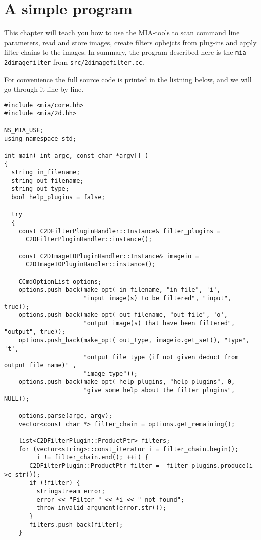\documentclass[english, 10pt, a4paper,headsepline,openany]{scrbook}
\begin{document}
\section{A simple program}
\label{ch:simple}

This chapter will teach you how to use the MIA-tools to scan command line parameters, read and store images, 
  create filters opbejcts from plug-ins and apply filter chains to the images. 
In summary, the program described here is the \texttt{mia-2dimagefilter} from \texttt{src/2dimagefilter.cc}. 

For convenience the full source code is printed in the listning below, and we will go through it line by line. 
\lstset{language=c++}
\begin{lstlisting}
#include <mia/core.hh>
#include <mia/2d.hh>

NS_MIA_USE; 
using namespace std; 

int main( int argc, const char *argv[] )
{
  string in_filename;
  string out_filename;
  string out_type; 
  bool help_plugins = false; 

  try 
  {
    const C2DFilterPluginHandler::Instance& filter_plugins = 
      C2DFilterPluginHandler::instance();
  
    const C2DImageIOPluginHandler::Instance& imageio = 
      C2DImageIOPluginHandler::instance();
  
    CCmdOptionList options;  
    options.push_back(make_opt( in_filename, "in-file", 'i', 
                      "input image(s) to be filtered", "input", true)); 
    options.push_back(make_opt( out_filename, "out-file", 'o', 
                      "output image(s) that have been filtered", "output", true)); 
    options.push_back(make_opt( out_type, imageio.get_set(), "type", 't',
                      "output file type (if not given deduct from output file name)" , 
                      "image-type"));
    options.push_back(make_opt( help_plugins, "help-plugins", 0, 
                      "give some help about the filter plugins", NULL)); 

    options.parse(argc, argv); 
    vector<const char *> filter_chain = options.get_remaining(); 

    list<C2DFilterPlugin::ProductPtr> filters;
    for (vector<string>::const_iterator i = filter_chain.begin(); 
         i != filter_chain.end(); ++i) {
       C2DFilterPlugin::ProductPtr filter =  filter_plugins.produce(i->c_str()); 
       if (!filter) {
         stringstream error; 
         error << "Filter " << *i << " not found"; 
         throw invalid_argument(error.str());
       }
       filters.push_back(filter);
    }


\end{lstlisting}
\end{document}
